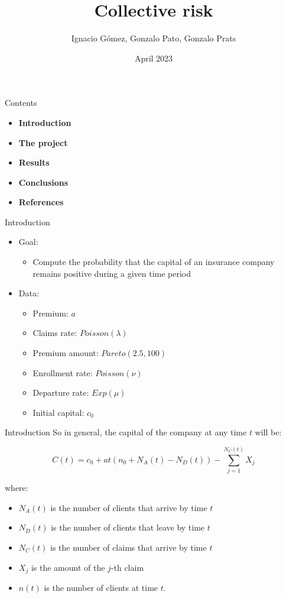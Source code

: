 \documentclass[
  ignorenonframetext,
]{beamer}
\title{Collective risk}
\author{Ignacio Gómez, Gonzalo Pato, Gonzalo Prats}
\date{April 2023}
\institute{Simulation in Prob and Stats BSc AMC at UC3M}
\providecommand{\tightlist}{%
  \setlength{\itemsep}{0pt}\setlength{\parskip}{0pt}}
\begin{document}
\frame{\titlepage}

\begin{frame}{Contents}
\protect\hypertarget{contents}{}
\begin{itemize}
\tightlist
\item
  \textbf{Introduction}
\item
  \textbf{The project}
\item
  \textbf{Results}
\item
  \textbf{Conclusions}
\item
  \textbf{References}
\end{itemize}
\end{frame}

\begin{frame}{Introduction}
\protect\hypertarget{introduction}{}
\begin{itemize}
\tightlist
\item
  Goal:

  \begin{itemize}
  \tightlist
  \item
    Compute the probability that the capital of an insurance company
    remains positive during a given time period
  \end{itemize}
\item
  Data:

  \begin{itemize}
  \tightlist
  \item
    Premium: \(a\)
  \item
    Claims rate: \(Poisson (\lambda)\)
  \item
    Premium amount: \(Pareto (2.5, 100)\)
  \item
    Enrollment rate: \(Poisson(\nu)\)
  \item
    Departure rate: \(Exp(\mu)\)
  \item
    Initial capital: \(c_0\)
  \end{itemize}
\end{itemize}
\end{frame}

\begin{frame}{Introduction}
\protect\hypertarget{introduction-1}{}
So in general, the capital of the company at any time \(t\) will be:

\[C(t) = c_0 + at(n_0+N_A(t)-N_D(t)) - \sum_{j=1}^{N_C(t)} X_j\]

where:

\begin{itemize}
\item $N_A(t)$ is the number of clients that arrive by time $t$
\item $N_D(t)$ is the number of clients that leave by time $t$
\item $N_C(t)$ is the number of claims that arrive by time $t$
\item $X_j$ is the amount of the $j$-th claim
\item $n(t)$ is the number of clients at time $t$.
\end{itemize}
\end{frame}
\end{document}
